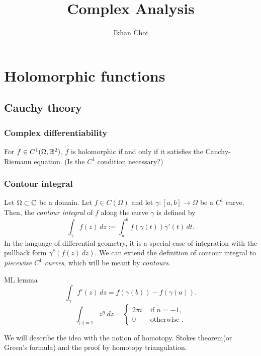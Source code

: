 \documentclass{../../large}
\begin{document}
\title{Complex Analysis}
\author{Ikhan Choi}
\maketitle
\tableofcontents


\part{Holomorphic functions}


\chapter{Cauchy theory}
\section{Complex differentiability}


\begin{prb}
\begin{parts}
\item For $f\in C^1(\Omega,\mathbb{R}^2)$, $f$ is holomorphic if and only if it satisfies the Cauchy-Riemann equation. (Is the $C^1$ condition necessary?)
\end{parts}
\end{prb}


\section{Contour integral}

\begin{prb}
Let $\Omega\subset\mathbb{C}$ be a domain.
Let $f\in C(\Omega)$ and let $\gamma:[a,b]\to\Omega$ be a $C^1$ curve.
Then, the \emph{contour integral} of $f$ along the curve $\gamma$ is defined by
\[\int_\gamma f(z)\,dz:=\int_a^bf(\gamma(t))\gamma'(t)\,dt.\]
In the language of differential geometry, it is a special case of integration with the pullback form $\gamma^*(f(z)\,dz)$.
We can extend the definition of contour integral to \emph{piecewise $C^1$ curves}, which will be meant by \emph{contours}.
\end{prb}
ML lemma
\[\int_\gamma f'(z)\,dz=f(\gamma(b))-f(\gamma(a)).\]
\[\int_{|z|=1}z^n\,dz=\begin{cases}2\pi i&\text{ if }n=-1,\\0&\text{ otherwise }.\end{cases}\]

\begin{prb}
We will describe the idea with the notion of homotopy.
Stokes theorem(or Green's formula) and the proof by homotopy triangulation.
\end{prb}
\end{document}
